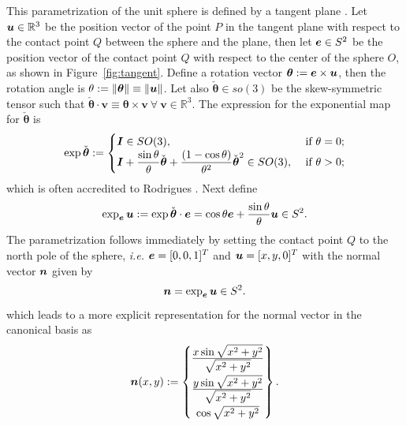 \documentclass[12pt]{article}
\newcommand{\mbs}[1]{\boldsymbol{#1}}
\newcommand{\mbb}[1]{\mathbb{#1}}
\def\bv{{\mbs{v}}} \def\bw{{\mbs{w}}} \def\bx{{\mbs{x}}}
\def\btheta{{\mbs{\theta}}}
\numberwithin{equation}{section}
\begin{document}
This parametrization of the unit sphere is defined by a tangent plane
\citep{Simo.Fox:1989}. Let $\bu\in \mbb{R}^3$ be the position vector
of the point $P$ in the tangent plane with respect to the contact
point $Q$ between the sphere and the plane, then let $\be \in S^2$ be
the position vector of the contact point $Q$ with respect to the
center of the sphere $O$, as shown in Figure~\ref{fig:tangent}. Define
a rotation vector $\btheta := \be \times \bu$, then the rotation angle
is $\theta := \| \btheta \| \equiv \| \bu \|$. Let also
$\check{\btheta} \in so(3)$ be the skew-symmetric tensor such that
$\check{\btheta} \cdot \bv \equiv \btheta \times \bv \ \forall \ \bv
\in \mbb{R}^3$. The expression for the exponential map for
$\check{\btheta}$ is
\begin{equation}
  \exp \check{\btheta}
  :=
  \begin{cases}
    \bI \in SO(3),
    &
    \text{ if }\theta = 0;
    \\
    \displaystyle{
      \bI + \frac{\sin \theta}{\theta} \check{\btheta} +
      \frac{(1 - \cos \theta)}{\theta^2} \check{\btheta}^2 \in SO(3),
    }
    &
    \text{ if }\theta > 0;
  \end{cases}
  \label{eq:Rodrigues-formula}
\end{equation}
which is often accredited to Rodrigues
\citep{Gallier:2011}. Next define
\begin{equation}
  \exp_{\be} \bu
  :=
  \exp \check{\btheta} \cdot \be
  =
  \cos \theta \be + \frac{\sin \theta}{\theta}
  \bu \in S^2.
\end{equation}
The parametrization follows immediately by setting the contact point
$Q$ to the north pole of the sphere, \emph{i.e.} $\be = [0,0,1]^T$ and
$\bu = [x,y,0]^T$ with the normal vector $\bn$ given by
\begin{equation}
  \bn
  =
  \exp_{\be} \bu \in S^2.
\end{equation}
which leads to a more explicit representation for the normal vector in
the canonical basis as
\begin{equation}
  \bn(x,y)
  := 
  \begin{Bmatrix}
    \frac{\displaystyle x \sin \sqrt{x^2+y^2}}{\displaystyle \sqrt{x^2+y^2}}
    \\[0.9em]
    \frac{\displaystyle y \sin \sqrt{x^2+y^2}}{\displaystyle \sqrt{x^2+y^2}}
    \\[0.9em]
    \cos \sqrt{x^2+y^2}
  \end{Bmatrix}.
\end{equation}
\end{document}
